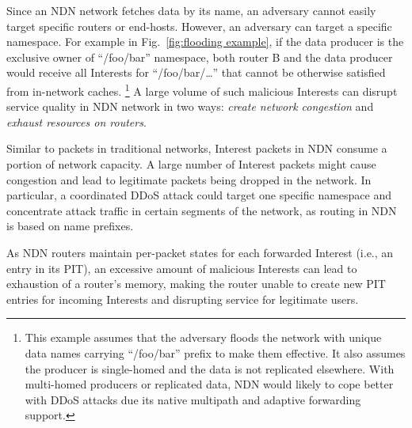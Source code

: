 \documentclass[10pt,conference]{IEEEtran}
\newcommand{\ndnName}[1]{``{\nicettfont #1}''}
\begin{document}
Since an NDN network fetches data by its name, an adversary cannot easily target specific routers or end-hosts.
However, an adversary can target a specific namespace.
For example in Fig.~\ref{fig:flooding example}, if the data producer is the exclusive owner of \ndnName{/foo/bar} namespace, both router B and the data producer would receive all Interests for \ndnName{/foo/bar/\ldots} that cannot be otherwise satisfied from in-network caches.%
\footnote {This example assumes that the adversary floods the network with unique data names carrying \ndnName{\small /foo/bar} prefix to make them effective. It also assumes the producer is single-homed and the data is not replicated elsewhere. With multi-homed producers or replicated data, NDN would likely to cope better with DDoS attacks due its native multipath and adaptive forwarding~\cite{adaptive-forwarding, Yi:2013:A-Case-for-Stateful} support.}
A large volume of such malicious Interests can disrupt service quality in NDN network in two ways: \emph{create network congestion} and \emph{exhaust resources on routers}.

Similar to packets in traditional networks, Interest packets in NDN consume a portion of network capacity. A large number of Interest packets might cause congestion and lead to legitimate packets being dropped in the network. In particular, a coordinated DDoS attack could target one specific namespace and concentrate attack traffic in certain segments of the network, as routing in NDN is based on name prefixes. 


As NDN routers maintain per-packet states for each forwarded Interest (i.e., an entry in its PIT), an excessive amount of malicious Interests can lead to exhaustion of a router's memory, making the router unable to create new PIT entries for incoming Interests and disrupting service for legitimate users.
\end{document}
